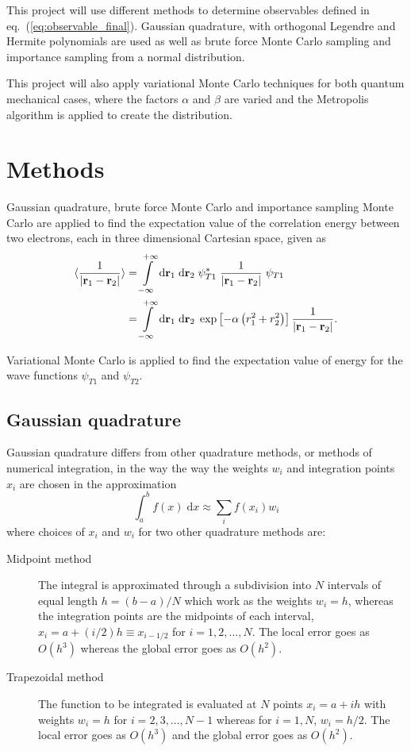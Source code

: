 \documentclass[a4paper,11pt]{article}
\newcommand{\diff}{\ensuremath{\; \text{d}}}
\begin{document}
This project will use different methods to determine observables defined in eq.~(\ref{eq:observable_final}). Gaussian quadrature, with orthogonal Legendre and Hermite polynomials are used as well as brute force Monte Carlo sampling and importance sampling from a normal distribution. 

This project will also apply variational Monte Carlo techniques for both quantum mechanical cases, where the factors $\alpha$ and $\beta$ are varied and the Metropolis algorithm is applied to create the distribution. 

\section{Methods}
Gaussian quadrature, brute force Monte Carlo and importance sampling Monte Carlo are applied to find the expectation value of the correlation energy between two electrons, each in three dimensional Cartesian space, given as
\begin{align}
    \langle \frac{1}{| \mathbf{r}_1 - \mathbf{r}_2 |} \rangle &= \int\limits_{-\infty}^{+\infty} \! \diff \mathbf{r}_1 \diff \mathbf{r}_2 \; \psi_{T1}^* \; \frac{1}{|\mathbf{r}_1 - \mathbf{r}_2 |} \; \psi_{T1} \notag \\
    &= \int\limits_{-\infty}^{+\infty} \! \diff \mathbf{r}_1 \diff \mathbf{r}_2 \; \exp\left[ -\alpha \left( r_1^2 + r_2^2 \right) \right] \frac{1}{|\mathbf{r}_1 - \mathbf{r}_2 |}.
    \label{eq:exp_corr_energy}
\end{align}

Variational Monte Carlo is applied to find the expectation value of energy for the wave functions $\psi_{T1}$ and $\psi_{T2}$. 

\subsection{Gaussian quadrature}
Gaussian quadrature differs from other quadrature methods, or methods of numerical integration, in the way the way the weights $w_i$ and integration points $x_i$ are chosen in the approximation
\begin{equation}
    \int_{a}^{b} f(x) \diff x \approx \sum_i f(x_i) w_i
    \label{eq:numint}
\end{equation}
where choices of $x_i$ and $w_i$ for two other quadrature methods are:
\begin{description}
    \item[Midpoint method] The integral is approximated through a subdivision into $N$ intervals of equal length $h = (b-a)/N$ which work as the weights $w_i = h$, whereas the integration points are the midpoints of each interval, $x_i = a + (i/2) h \equiv x_{i-1/2}$ for $i=1,2,\dots,N$. The local error goes as $O(h^3)$ whereas the global error goes as $O(h^2)$.
    \item[Trapezoidal method] The function to be integrated is evaluated at $N$ points $x_i = a + ih$ with weights $w_i = h$ for $i=2,3,\dots,N-1$ whereas for $i=1,N$, $w_i = h/2$. The local error goes as $O(h^3)$ and the global error goes as $O(h^2)$. 
\end{description} 
\end{document}
